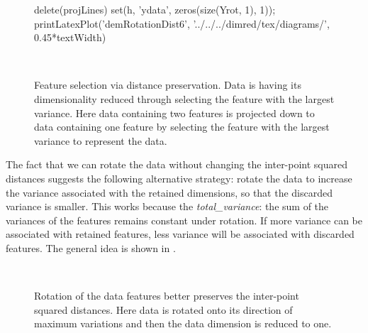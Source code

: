 \begin{figure}
\begin{octave}
    delete(projLines)
    set(h, 'ydata', zeros(size(Yrot, 1), 1));
    printLatexPlot('demRotationDist6', '../../../dimred/tex/diagrams/', 0.45*textWidth)
  \end{octave}

  \subfigure[Data with two features ($\dataDim=2$) shown as a scatter plot.]{
    }\hfill
  \\
  \centerline{}

  \caption{Feature selection via distance preservation. Data is having
    its dimensionality reduced through selecting the feature with the
    largest variance. Here data containing two features is projected
    down to data containing one feature by selecting the feature with
    the largest variance to represent the
    data.}\label{fig:demNoRotationDistFeatureSelection}
\end{figure}


The fact that we can rotate the data without changing the inter-point
squared distances suggests the following alternative strategy: rotate
the data to increase the variance associated with the retained
dimensions, so that the discarded variance is smaller. This works
because the \emph{\gls{total_variance}}: the sum of the variances of the
features remains constant under rotation. If more variance can be
associated with retained features, less variance will be associated
with discarded features. The general idea is shown in
.
% 
\begin{figure}
  \hfill
  \\
  \hfill

  \caption{Rotation of the data features better preserves the
    inter-point squared distances. Here data is rotated onto its
    direction of maximum variations and then the data dimension is
    reduced to one.}\label{fig:demRotationDistFeatureSelection}

\end{figure}



